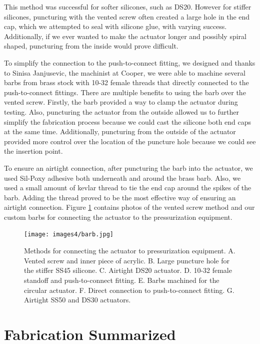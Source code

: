 This method was successful for softer silicones, such as DS20. However for stiffer silicones, puncturing with the vented screw often created a large hole in the end cap, which we attempted to seal with silicone glue, with varying success. Additionally, if we ever wanted to make the actuator longer and possibly spiral shaped, puncturing from the inside would prove difficult. 

To simplify the connection to the push-to-connect fitting, we designed and thanks to Sinisa Janjusevic, the machinist at Cooper, we were able to machine several barbs from brass stock with 10-32 female threads that directly connected to the push-to-connect fittings. There are multiple benefits to using the barb over the vented screw. Firstly, the barb provided a way to clamp the actuator during testing. Also, puncturing the actuator from the outside allowed us to further simplify the fabrication process because we could cast the silicone both end caps at the same time. Additionally, puncturing from the outside of the actuator provided more control over the location of the puncture hole because we could see the insertion point. 

To ensure an airtight connection, after puncturing the barb into the actuator, we used Sil-Poxy adhesive both underneath and around the brass barb. Also, we used a small amount of kevlar thread to tie the end cap around the spikes of the barb. Adding the thread proved to be the most effective way of ensuring an airtight connection. Figure \ref{fig:barb} contains photos of the vented screw method and our custom barbs for connecting the actuator to the pressurization equipment. 

\begin{figure}[h!]
    \centering
    \texttt{[image: images4/barb.jpg]}
    \caption{Methods for connecting the actuator to pressurization equipment. A. Vented screw and inner piece of acrylic. B. Large puncture hole for the stiffer SS45 silicone. C. Airtight DS20 actuator. D. 10-32 female standoff and push-to-connect fitting. E. Barbs machined for the circular actuator. F. Direct connection to push-to-connect fitting. G. Airtight SS50 and DS30 actuators. }
    \label{fig:barb}
\end{figure}


\section{Fabrication Summarized}

